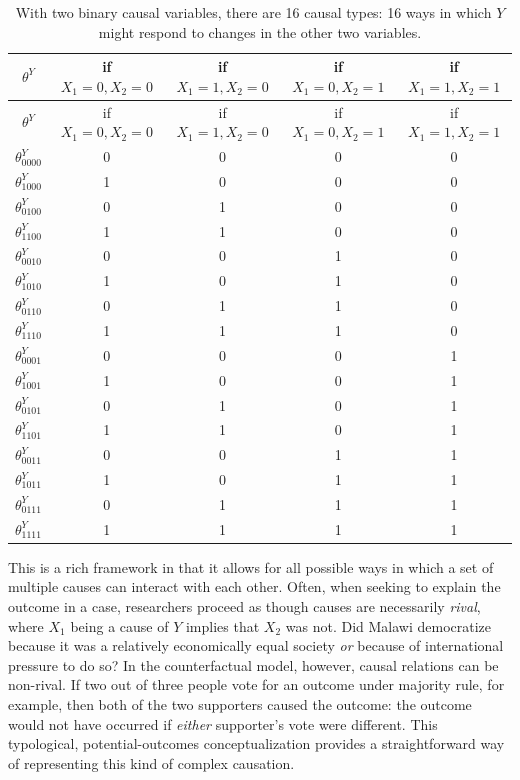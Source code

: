 \documentclass[
  12pt,
]{book}
\begin{document}
\begin{longtable}[]{@{}ccccc@{}}
\caption{\label{tab:PO16}With two binary causal variables, there are 16 causal types: 16 ways in which \(Y\) might respond to changes in the other two variables.}\tabularnewline
\toprule
\(\theta^Y\) & if \(X_1=0, X_2=0\) & if \(X_1=1,X_2=0\) & if \(X_1=0,X_2=1\) & if \(X_1=1, X_2=1\) \\
\midrule
\endfirsthead
\toprule
\(\theta^Y\) & if \(X_1=0, X_2=0\) & if \(X_1=1,X_2=0\) & if \(X_1=0,X_2=1\) & if \(X_1=1, X_2=1\) \\
\midrule
\endhead
\(\theta^Y_{0000}\) & 0 & 0 & 0 & 0 \\
\(\theta^Y_{1000}\) & 1 & 0 & 0 & 0 \\
\(\theta^Y_{0100}\) & 0 & 1 & 0 & 0 \\
\(\theta^Y_{1100}\) & 1 & 1 & 0 & 0 \\
\(\theta^Y_{0010}\) & 0 & 0 & 1 & 0 \\
\(\theta^Y_{1010}\) & 1 & 0 & 1 & 0 \\
\(\theta^Y_{0110}\) & 0 & 1 & 1 & 0 \\
\(\theta^Y_{1110}\) & 1 & 1 & 1 & 0 \\
\(\theta^Y_{0001}\) & 0 & 0 & 0 & 1 \\
\(\theta^Y_{1001}\) & 1 & 0 & 0 & 1 \\
\(\theta^Y_{0101}\) & 0 & 1 & 0 & 1 \\
\(\theta^Y_{1101}\) & 1 & 1 & 0 & 1 \\
\(\theta^Y_{0011}\) & 0 & 0 & 1 & 1 \\
\(\theta^Y_{1011}\) & 1 & 0 & 1 & 1 \\
\(\theta^Y_{0111}\) & 0 & 1 & 1 & 1 \\
\(\theta^Y_{1111}\) & 1 & 1 & 1 & 1 \\
\bottomrule
\end{longtable}

This is a rich framework in that it allows for all possible ways in which a set of multiple causes can interact with each other. Often, when seeking to explain the outcome in a case, researchers proceed as though causes are necessarily \emph{rival}, where \(X_1\) being a cause of \(Y\) implies that \(X_2\) was not. Did Malawi democratize because it was a relatively economically equal society \emph{or} because of international pressure to do so? In the counterfactual model, however, causal relations can be non-rival. If two out of three people vote for an outcome under majority rule, for example, then both of the two supporters caused the outcome: the outcome would not have occurred if \emph{either} supporter's vote were different. This typological, potential-outcomes conceptualization provides a straightforward way of representing this kind of complex causation.
\end{document}

